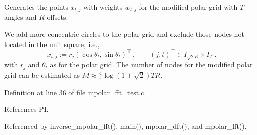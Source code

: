 Generates the points $x_{t,j}$ with weights $w_{t,j}$ for the modified polar grid with $T$ angles and $R$ offsets. 

We add more concentric circles to the polar grid and exclude those nodes not located in the unit square, i.e., \[ x_{t,j} := r_j\left(\cos\theta_t, \sin\theta_t\right)^{\top}\,,\qquad (j,t)^{\top}\in I_{\sqrt{2}R}\times I_T\,. \] with $r_j$ and $\theta_t$ as for the polar grid. The number of nodes for the modified polar grid can be estimated as $M \approx \frac{4}{\pi}\log(1+\sqrt{2}) T R$. 

Definition at line 36 of file mpolar\_\-fft\_\-test.c.

References PI.

Referenced by inverse\_\-mpolar\_\-fft(), main(), mpolar\_\-dft(), and mpolar\_\-fft().